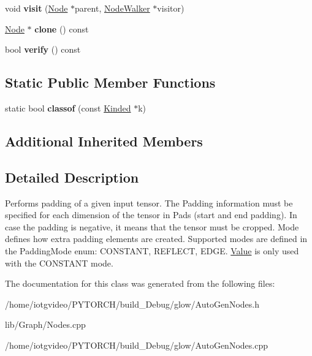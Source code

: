 \begin{DoxyCompactItemize}
\mbox{\label{classglow_1_1_pad_node_a41fc4d81b5f69b7f670509bbcf3b38d7}} 
void {\bfseries visit} (\hyperlink{classglow_1_1_node}{Node} $\ast$parent, \hyperlink{classglow_1_1_node_walker}{Node\+Walker} $\ast$visitor)
\item 
\mbox{\label{classglow_1_1_pad_node_a703f14e32688bb501f9a35bda3f54f04}} 
\hyperlink{classglow_1_1_node}{Node} $\ast$ {\bfseries clone} () const
\item 
\mbox{\label{classglow_1_1_pad_node_a77d173ca4d0d3ebf925dea74ce96e18e}} 
bool {\bfseries verify} () const
\end{DoxyCompactItemize}
\subsection*{Static Public Member Functions}
\begin{DoxyCompactItemize}
\item 
\mbox{\label{classglow_1_1_pad_node_ae1d9327503a1b4b56dfb5b6b56e436f7}} 
static bool {\bfseries classof} (const \hyperlink{classglow_1_1_kinded}{Kinded} $\ast$k)
\end{DoxyCompactItemize}
\subsection*{Additional Inherited Members}


\subsection{Detailed Description}
Performs padding of a given input tensor. The Padding information must be specified for each dimension of the tensor in Pads (start and end padding). In case the padding is negative, it means that the tensor must be cropped. Mode defines how extra padding elements are created. Supported modes are defined in the Padding\+Mode enum\+: C\+O\+N\+S\+T\+A\+NT, R\+E\+F\+L\+E\+CT, E\+D\+GE. \hyperlink{classglow_1_1_value}{Value} is only used with the C\+O\+N\+S\+T\+A\+NT mode. 

The documentation for this class was generated from the following files\+:\begin{DoxyCompactItemize}
\item 
/home/iotgvideo/\+P\+Y\+T\+O\+R\+C\+H/build\+\_\+\+Debug/glow/Auto\+Gen\+Nodes.\+h\item 
lib/\+Graph/Nodes.\+cpp\item 
/home/iotgvideo/\+P\+Y\+T\+O\+R\+C\+H/build\+\_\+\+Debug/glow/Auto\+Gen\+Nodes.\+cpp\end{DoxyCompactItemize}
